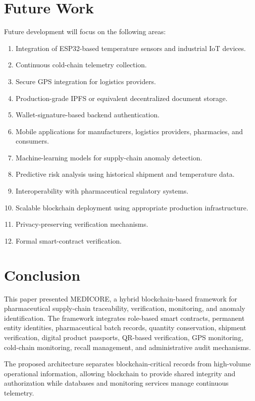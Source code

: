 \documentclass[11pt,a4paper]{article}
\begin{document}
\section{Future Work}
Future development will focus on the following areas:
\begin{enumerate}
    \item Integration of ESP32-based temperature sensors and industrial IoT devices.
    \item Continuous cold-chain telemetry collection.
    \item Secure GPS integration for logistics providers.
    \item Production-grade IPFS or equivalent decentralized document storage.
    \item Wallet-signature-based backend authentication.
    \item Mobile applications for manufacturers, logistics providers, pharmacies, and consumers.
    \item Machine-learning models for supply-chain anomaly detection.
    \item Predictive risk analysis using historical shipment and temperature data.
    \item Interoperability with pharmaceutical regulatory systems.
    \item Scalable blockchain deployment using appropriate production infrastructure.
    \item Privacy-preserving verification mechanisms.
    \item Formal smart-contract verification.
\end{enumerate}

\section{Conclusion}
This paper presented MEDICORE, a hybrid blockchain-based framework for pharmaceutical supply-chain traceability, verification, monitoring, and anomaly identification. The framework integrates role-based smart contracts, permanent entity identities, pharmaceutical batch records, quantity conservation, shipment verification, digital product passports, QR-based verification, GPS monitoring, cold-chain monitoring, recall management, and administrative audit mechanisms.

The proposed architecture separates blockchain-critical records from high-volume operational information, allowing blockchain to provide shared integrity and authorization while databases and monitoring services manage continuous telemetry.
\end{document}
